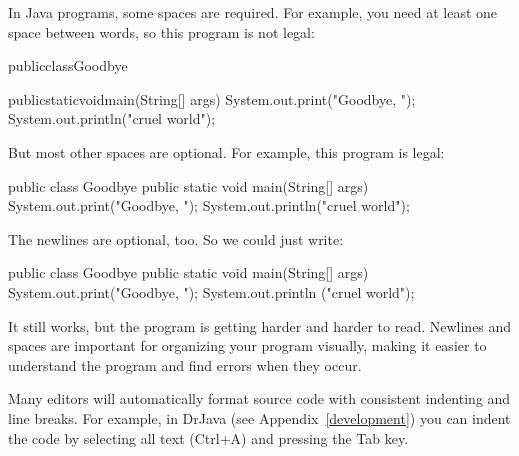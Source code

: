 \documentclass[12pt]{book}
\theoremstyle{exercise}
\begin{document}
In Java programs, some spaces are required.
For example, you need at least one space between words, so this program is not legal:

\begin{code}
publicclassGoodbye{

    publicstaticvoidmain(String[] args) {
        System.out.print("Goodbye, ");
        System.out.println("cruel world");
    }
}
\end{code}

But most other spaces are optional.
For example, this program is legal:

\begin{code}
public class Goodbye {
public static void main(String[] args) {
System.out.print("Goodbye, ");
System.out.println("cruel world");
}
}
\end{code}

The newlines are optional, too.
So we could just write:

\begin{code}
public class Goodbye { public static void main(String[] args)
{ System.out.print("Goodbye, "); System.out.println
("cruel world");}}
\end{code}

It still works, but the program is getting harder and harder to read.
Newlines and spaces are important for organizing your program visually, making it easier to understand the program and find errors when they occur.

Many editors will automatically format source code with consistent indenting and line breaks.
For example, in DrJava (see Appendix~\ref{development}) you can indent the code by selecting all text ({\sf Ctrl+A}) and pressing the {\sf Tab} key.


%

\end{document}
